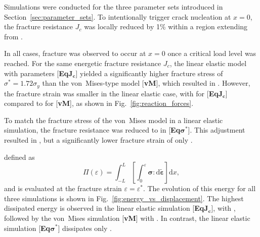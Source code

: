 \documentclass[pdflatex,sn-mathphys-num]{sn-jnl}%
\newcommand{\vMLabel}{[\textbf{vM}]\xspace}
\newcommand{\EqJcLabel}{[\textbf{Eq$\boldsymbol{J_c}$}]\xspace}
\newcommand{\EqSigmaStarLabel}{[\textbf{Eq$\boldsymbol{\sigma^*}$}]\xspace}
\theoremstyle{thmstyleone}%
\theoremstyle{thmstyletwo}%
\theoremstyle{thmstylethree}%
\begin{document}
Simulations were conducted for the three parameter sets introduced in Section~\ref{sec:parameter_sets}. To intentionally trigger crack nucleation at $x = 0$, the fracture resistance $J_c$ was locally reduced by 1\% within a region extending from .

In all cases, fracture was observed to occur at $x = 0$ once a critical load level was 
reached. For the same energetic fracture resistance $J_c$, the linear elastic model with parameters \EqJcLabel yielded a significantly higher fracture stress of $\sigma^* = 1.72\sigma_y$ than the von~Mises-type model \vMLabel, which resulted in . However, the fracture strain was smaller in the linear elastic case, with  for \EqJcLabel compared to  for \vMLabel, as shown in Fig.~\ref{fig:reaction_forces}.

To match the fracture stress of the von~Mises model in a linear elastic simulation, the fracture resistance was reduced to  in \EqSigmaStarLabel{}. This adjustment resulted in , but a significantly lower fracture strain of only .

 defined as
\begin{equation}
   \Pi(\varepsilon) = \int_{-L}^{L}
   \left[\int_{0}^{\varepsilon} \boldsymbol{\sigma} :
   \mathrm{d}\tilde{\boldsymbol{\varepsilon}}\right] \mathrm{d}x,
   \label{eq:total_energy}
\end{equation}
and is evaluated at the fracture strain $\varepsilon = \varepsilon^*$. The evolution of this energy for all three simulations is shown in Fig.~\ref{fig:energy_vs_displacement}. The highest dissipated energy is observed in the linear elastic simulation \EqJcLabel, with , followed by the von~Mises simulation \vMLabel with . In contrast, the linear elastic simulation \EqSigmaStarLabel dissipates only .
\end{document}
